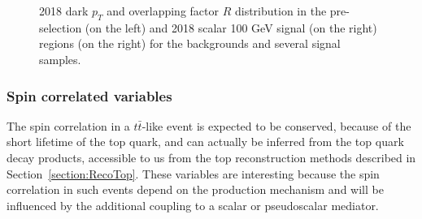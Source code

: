 \documentclass[a4paper, 10pt, openright]{report}
\begin{document}
\begin{figure}[htbp]
\caption{2018 dark $p_T$ and overlapping factor $R$ distribution in the pre-selection (on the left) and 2018 scalar 100 GeV signal (on the right) regions (on the right) for the backgrounds and several signal samples.}
\label{fig:SRdisc1}
\end{figure}

\subsubsection*{Spin correlated variables}

The spin correlation in a $t \bar t$-like event is expected to be conserved, because of the short lifetime of the top quark, and can actually be inferred from the top quark decay products, accessible to us from the top reconstruction methods described in Section~\ref{section:RecoTop}. These variables are interesting because the spin correlation in such events depend on the production mechanism and will be influenced by the additional coupling to a scalar or pseudoscalar mediator.
\end{document}
